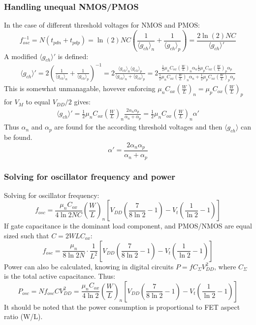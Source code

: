 \documentclass[10pt,a4paper]{article}
\begin{document}
	\subsubsection{Handling unequal NMOS/PMOS}
	In the case of different threshold voltages for NMOS and PMOS:
	\begin{equation}
	f_{osc}^{-1} = N(t_{pdn} + t_{pdp}) = \ln(2)NC\left(\frac{1}{\langle g_{ch}\rangle_n} + \frac{1}{\langle g_{ch}\rangle_p}\right) = \frac{2\ln(2)NC}{\langle g_{ch}\rangle'}
	\end{equation}	
	A modified $\langle g_{ch}\rangle'$ is defined:
	\begin{align}
	\langle g_{ch}\rangle' = 2\left(\frac{1}{\langle g_{ch}\rangle_n} + \frac{1}{\langle g_{ch}\rangle_p}\right)^{-1} = 2\frac{\langle g_{ch}\rangle_n \langle g_{ch}\rangle_p}{\langle g_{ch}\rangle_n + \langle g_{ch}\rangle_p}
	= 2\frac{\frac{1}{2}\mu_nC_{ox}\left(\frac{W}{L}\right)_n \alpha_n\frac{1}{2}\mu_pC_{ox}\left(\frac{W}{L}\right)_p \alpha_p}{\frac{1}{2}\mu_nC_{ox}\left(\frac{W}{L}\right)_n\alpha_n + \frac{1}{2}\mu_pC_{ox}\left(\frac{W}{L}\right)_p\alpha_p}
	\end{align}	
	This is somewhat unmanagable, hovever enforcing $\mu_nC_{ox}\left(\frac{W}{L}\right)_n = \mu_pC_{ox}\left(\frac{W}{L}\right)_p$ for $V_M$ to equal $V_{DD}/2$ gives:
	\begin{align}
	\langle g_{ch}\rangle' = \frac{1}{2}\mu_nC_{ox}\left(\frac{W}{L}\right)_n\frac{2 \alpha_n\alpha_p}{\alpha_n + \alpha_p} = \frac{1}{2}\mu_nC_{ox}\left(\frac{W}{L}\right)_n \alpha'
	\end{align}	
	Thus $\alpha_n$ and $\alpha_p$ are found for the according threshold voltages and then $\langle g_{ch}\rangle$ can be found.
	\begin{equation}
	\alpha' =  \frac{2 \alpha_n\alpha_p}{\alpha_n + \alpha_p}
	\end{equation}
	\subsubsection{Solving for oscillator frequency and power}
	Solving for oscillator frequency:
	\begin{equation}
		f_{osc} = \frac{\mu_nC_{ox}}{4\ln2NC}\left(\frac{W}{L}\right)_n\left[V_{DD}\left(\frac{7}{8\ln2}-1\right)-V_t\left(\frac{1}{\ln2}-1\right) \right]
	\end{equation}
	If gate capacitance is the dominant load component, and PMOS/NMOS are equal sized such that $C=2WLC_{ox}$:
	\begin{equation}
		f_{osc} = \frac{\mu_n}{8\ln2N}\cdot\frac{1}{L^2}\left[V_{DD}\left(\frac{7}{8\ln2}-1\right)-V_t\left(\frac{1}{\ln2}-1\right) \right]
	\end{equation}
	Power can also be calculated, knowing in digital circuits $P = fC_{\Sigma}V_{DD}^2$, where $C_{\Sigma}$ is the total active capacitance. Thus:
	\begin{equation}
		P_{osc} = Nf_{osc}CV_{DD}^2 = \frac{\mu_nC_{ox}}{4\ln2}\left(\frac{W}{L}\right)_n\left[V_{DD}\left(\frac{7}{8\ln2}-1\right)-V_t\left(\frac{1}{\ln2}-1\right) \right]
	\end{equation}
	It should be noted that the power consumption is proportional to FET aspect ratio (W/L).
\end{document}
